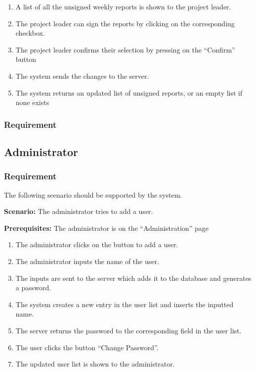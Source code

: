 \documentclass{article}
\begin{document}
\begin{enumerate}
    \item A list of all the unsigned weekly reports is shown to the project leader.
    \item The project leader can sign the reports by clicking on the corresponding checkbox.
    \item The project leader confirms their selection by pressing on the “Confirm” button
    \item The system sends the changes to the server.
    \item The system returns an updated list of unsigned reports, or an empty list if none exists
\end{enumerate}
\subsubsection{Requirement}

\subsection{Administrator}
\subsubsection{Requirement}
The following scenario should be supported by the system.

\textbf{Scenario:} The administrator tries to add a user.

\textbf{Prerequisites:} The administrator is on the “Administration” page

\begin{enumerate}
    \item The administrator clicks on the button to add a user.
    \item The administrator inputs the name of the user.
    \item The inputs are sent to the server which adds it to the database and generates a password.
    \item The system creates a new entry in the user list and inserts the inputted name.
    \item The server returns the password to the corresponding field in the user list.
    \item The user clicks the button “Change Password”.
    \item The updated user list is shown to the administrator.
\end{enumerate}
\end{document}
